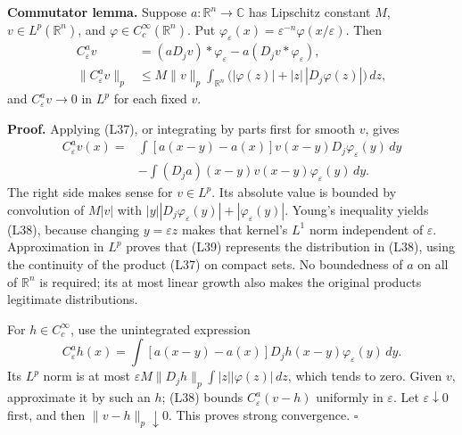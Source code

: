 \documentclass[
  11pt,
]{article}
\makeatletter
\let\ReaderOriginalAnchorStart\hyper@anchorstart
\let\ReaderOriginalAnchorEnd\hyper@anchorend
\let\ReaderPendingAliases\@empty
\def\ReaderArmAliases#1{\gdef\ReaderPendingAliases{#1}}
\def\hyper@anchorstart#1{\ReaderIfNativeAnchorTF{#1}{\ReaderPendingAliases\global\let\ReaderPendingAliases\@empty}{}\ReaderOriginalAnchorStart{#1}}
\makeatother
\begin{document}
\textbf{Commutator lemma.} Suppose \(a:\mathbb R^n\to\mathbb C\) has
Lipschitz constant \(M\), \(v\in L^p(\mathbb R^n)\), and
\(\varphi\in C_c^\infty(\mathbb R^n)\). Put
\(\varphi_\varepsilon(x)=\varepsilon^{-n}\varphi(x/\varepsilon)\). Then
\[
\begin{split}
C_\varepsilon^a v&=(aD_jv)*\varphi_\varepsilon
                     -a(D_jv*\varphi_\varepsilon),\\
\|C_\varepsilon^a v\|_p
&\leq M\|v\|_p\int_{\mathbb R^n}
       \bigl(|\varphi(z)|+|z|\,|D_j\varphi(z)|\bigr)\,dz,
\end{split}                                                       \tag{L38}
\] and \(C_\varepsilon^a v\to0\) in \(L^p\) for each fixed \(v\).

\textbf{Proof.} Applying (L37), or integrating by parts first for smooth
\(v\), gives \[
\begin{split}
C_\varepsilon^a v(x)
={}&\int [a(x-y)-a(x)]v(x-y)D_j\varphi_\varepsilon(y)\,dy\\
 &-\int (D_ja)(x-y)v(x-y)\varphi_\varepsilon(y)\,dy.
\end{split}                \tag{L39}
\] The right side makes sense for \(v\in L^p\). Its absolute value is
bounded by convolution of \(M|v|\) with
\(|y||D_j\varphi_\varepsilon(y)|+|\varphi_\varepsilon(y)|\). Young's
inequality yields (L38), because changing \(y=\varepsilon z\) makes that
kernel's \(L^1\) norm independent of \(\varepsilon\). Approximation in
\(L^p\) proves that (L39) represents the distribution in (L38), using
the continuity of the product (L37) on compact sets. No boundedness of
\(a\) on all of \(\mathbb R^n\) is required; its at most linear growth
also makes the original products legitimate distributions.

For \(h\in C_c^\infty\), use the unintegrated expression \[
C_\varepsilon^a h(x)=\int[a(x-y)-a(x)]D_jh(x-y)\varphi_\varepsilon(y)\,dy.
\] Its \(L^p\) norm is at most
\(\varepsilon M\|D_jh\|_p\int|z||\varphi(z)|\,dz\), which tends to zero.
Given \(v\), approximate it by such an \(h\); (L38) bounds
\(C_\varepsilon^a(v-h)\) uniformly in \(\varepsilon\). Let
\(\varepsilon\downarrow0\) first, and then \(\|v-h\|_p\downarrow0\).
This proves strong convergence. \(\square\)

\ReaderArmAliases{\ReaderOriginalAnchorStart{AN03-LCE-008}\ReaderOriginalAnchorEnd\begingroup\expandafter\def\csname @currentHref\endcsname{AN03-LCE-008}\label{AN03-LCE-008}\endgroup\ReaderOriginalAnchorStart{an03-lce-008-recovering-the-highest-derivatives-from-the-equation}\ReaderOriginalAnchorEnd\begingroup\expandafter\def\csname @currentHref\endcsname{an03-lce-008-recovering-the-highest-derivatives-from-the-equation}\label{an03-lce-008-recovering-the-highest-derivatives-from-the-equation}\endgroup\ReaderOriginalAnchorStart{8-recovering-the-highest-derivatives-from-the-equation}\ReaderOriginalAnchorEnd\begingroup\expandafter\def\csname @currentHref\endcsname{8-recovering-the-highest-derivatives-from-the-equation}\label{8-recovering-the-highest-derivatives-from-the-equation}\endgroup\ReaderOriginalAnchorStart{recovering-the-highest-derivatives-from-the-equation}\ReaderOriginalAnchorEnd}
\end{document}
